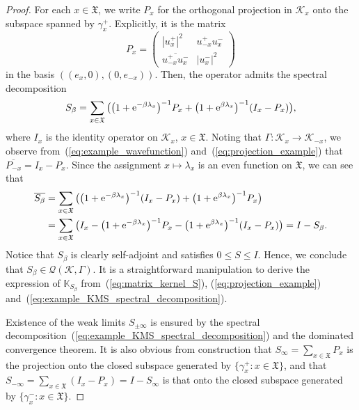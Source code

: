 \documentclass[pdftex]{sigma}
\numberwithin{equation}{section}
\newcommand{\mfrak}[1]{\mathfrak{#1}}
\newcommand{\mcal}[1]{\mathcal{#1}}
\newcommand{\mbb}[1]{\mathbb{#1}}
\begin{document}
\begin{proof}For each $x\in \mfrak{X}$, we write $P_{x}$ for the orthogonal projection in $\mcal{K}_{x}$ onto the subspace spanned by $\gamma^{+}_{x}$.
Explicitly, it is the matrix
\begin{equation}\label{eq:projection_example}
	P_{x}=\left(
	\begin{matrix}
		|u^{+}_{x}|^{2} & u^{+}_{-x}u^{-}_{x} \\
		\overline{u^{+}_{-x}u^{-}_{x}} & |u^{-}_{x}|^{2}
	\end{matrix}
	\right)
\end{equation}
in the basis $((e_{x},0), (0,e_{-x}))$.
Then, the operator admits the spectral decomposition
\begin{equation}\label{eq:example_KMS_spectral_decomposition}
	S_{\beta}=\sum_{x\in\mfrak{X}}\big(\big(1+{\rm e}^{-\beta\lambda_{x}}\big)^{-1}P_{x}+\big(1+{\rm e}^{\beta\lambda_{x}}\big)^{-1}(I_{x}-P_{x})\big),
\end{equation}
where $I_{x}$ is the identity operator on $\mcal{K}_{x}$, $x\in\mfrak{X}$.
Noting that $\Gamma\colon \mcal{K}_{x}\to\mcal{K}_{-x}$, we observe from~(\ref{eq:example_wavefunction}) and~(\ref{eq:projection_example}) that $\overline{P_{-x}}=I_{x}-P_{x}$.
Since the assignment $x\mapsto \lambda_{x}$ is an even function on $\mfrak{X}$, we can see that
\begin{align*}
	\overline{S_{\beta}}
	&=\sum_{x\in\mfrak{X}}\big(\big(1+{\rm e}^{-\beta\lambda_{x}}\big)^{-1}(I_{x}-P_{x})+\big(1+{\rm e}^{\beta\lambda_{x}}\big)^{-1}P_{x}\big) \\
&=\sum_{x\in\mfrak{X}}\big(I_{x}-\big(1+{\rm e}^{-\beta\lambda_{x}}\big)^{-1}P_{x}-\big(1+{\rm e}^{\beta\lambda_{x}}\big)^{-1}(I_{x}-P_{x})\big)
	 =I-S_{\beta}.
\end{align*}
Notice that $S_{\beta}$ is clearly self-adjoint and satisfies $0\leq S\leq I$. Hence, we conclude that $S_{\beta}\in \mcal{Q}(\mcal{K},\Gamma)$.
It is a straightforward manipulation to derive the expression of $\mbb{K}_{S_{\beta}}$ from~(\ref{eq:matrix_kernel_S}), (\ref{eq:projection_example}) and~(\ref{eq:example_KMS_spectral_decomposition}).

Existence of the weak limits $S_{\pm\infty}$ is ensured by the spectral decomposition~(\ref{eq:example_KMS_spectral_decomposition}) and the dominated convergence theorem.
It is also obvious from construction that $S_{\infty}=\sum_{x\in\mfrak{X}}P_{x}$ is the projection onto the closed subspace generated by $\big\{\gamma_{x}^{+}\colon x\in\mfrak{X}\}$, and that $S_{-\infty}=\sum_{x\in\mfrak{X}}(I_{x}-P_{x})=I-S_{\infty}$ is that onto the closed subspace generated by $\big\{\gamma_{x}^{-}\colon x\in\mfrak{X}\big\}$.
\end{proof}
\end{document}

